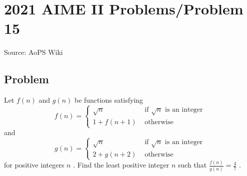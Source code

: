 \documentclass[12pt]{article}
\begin{document}
\section*{{2021 AIME II Problems/Problem 15}}
Source: AoPS Wiki

\subsection*{Problem}
Let $f(n)$ and $g(n)$ be functions satisfying \[f(n) = \begin{cases}\sqrt{n} & \text{ if } \sqrt{n} \text{ is an integer}\\ 1 + f(n+1) & \text{ otherwise} \end{cases}\] and \[g(n) = \begin{cases}\sqrt{n} & \text{ if } \sqrt{n} \text{ is an integer}\\ 2 + g(n+2) & \text{ otherwise} \end{cases}\] for positive integers $n$ . Find the least positive integer $n$ such that $\tfrac{f(n)}{g(n)} = \tfrac{4}{7}$ .
\end{document}

